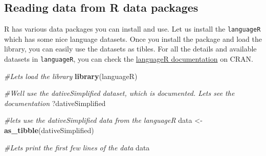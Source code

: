 \documentclass[
]{book}
\newenvironment{Shaded}{\begin{snugshade}}{\end{snugshade}}
\newcommand{\CommentTok}[1]{\textcolor[rgb]{0.56,0.35,0.01}{\textit{#1}}}
\newcommand{\FunctionTok}[1]{\textcolor[rgb]{0.13,0.29,0.53}{\textbf{#1}}}
\newcommand{\NormalTok}[1]{#1}
\newcommand{\OtherTok}[1]{\textcolor[rgb]{0.56,0.35,0.01}{#1}}
\begin{document}
\hypertarget{reading-data-from-r-data-packages}{%
\subsection{Reading data from R data packages}\label{reading-data-from-r-data-packages}}

R has various data packages you can install and use. Let us install the \texttt{languageR} which has some nice language datasets. Once you install the package and load the library, you can easily use the datasets as tibles. For all the details and available datasets in \texttt{languageR}, you can check the \href{https://cran.r-project.org/web/packages/languageR/languageR.pdf}{languageR documentation} on CRAN.

\begin{Shaded}
\begin{Highlighting}[]
\CommentTok{\#Let\textquotesingle{}s load the library}
\FunctionTok{library}\NormalTok{(languageR)}

\CommentTok{\#We\textquotesingle{}ll use the dativeSimplified dataset, which is documented. Let\textquotesingle{}s see the documentation}
\NormalTok{?dativeSimplified}
\end{Highlighting}
\end{Shaded}

\begin{Shaded}
\begin{Highlighting}[]
\CommentTok{\#let\textquotesingle{}s use the dativeSimplified data from the languageR }
\NormalTok{data }\OtherTok{\textless{}{-}} \FunctionTok{as\_tibble}\NormalTok{(dativeSimplified)}

\CommentTok{\#Let\textquotesingle{}s print the first few lines of the data}
\NormalTok{data}
\end{Highlighting}
\end{Shaded}
\end{document}
